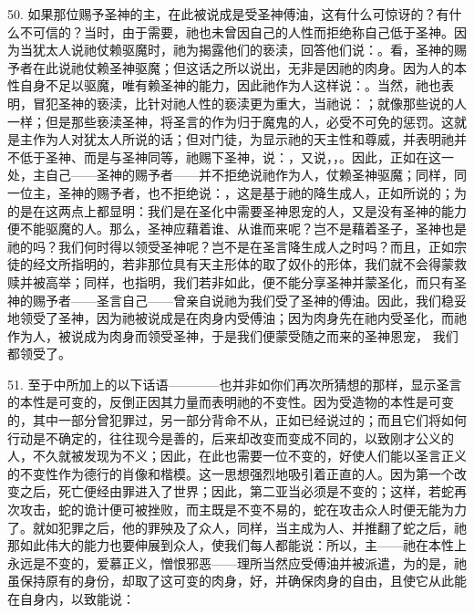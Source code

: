 50. 如果那位赐予圣神的主，在此被说成是受圣神傅油，这有什么可惊讶的？有什么不可信的？当时，由于需要，祂也未曾因自己的人性而拒绝称自己低于圣神。因为当犹太人说祂仗赖驱魔时，祂为揭露他们的亵渎，回答他们说：。看，圣神的赐予者在此说祂仗赖圣神驱魔；但这话之所以说出，无非是因祂的肉身。因为人的本性自身不足以驱魔，唯有赖圣神的能力，因此祂作为人这样说：。当然，祂也表明，冒犯圣神的亵渎，比针对祂人性的亵渎更为重大，当祂说：；就像那些说的人一样；但是那些亵渎圣神，将圣言的作为归于魔鬼的人，必受不可免的惩罚。这就是主作为人对犹太人所说的话；但对门徒，为显示祂的天主性和尊威，并表明祂并不低于圣神、而是与圣神同等，祂赐下圣神，说：，又说，，。因此，正如在这一处，主自己——圣神的赐予者——并不拒绝说祂作为人，仗赖圣神驱魔；同样，同一位主，圣神的赐予者，也不拒绝说：，这是基于祂的降生成人，正如所说的；为的是在这两点上都显明：我们是在圣化中需要圣神恩宠的人，又是没有圣神的能力便不能驱魔的人。那么，圣神应藉着谁、从谁而来呢？岂不是藉着圣子，圣神也是祂的吗？我们何时得以领受圣神呢？岂不是在圣言降生成人之时吗？而且，正如宗徒的经文所指明的，若非那位具有天主形体的取了奴仆的形体，我们就不会得蒙救赎并被高举；同样，也指明，我们若非如此，便不能分享圣神并蒙圣化，而只有圣神的赐予者——圣言自己——曾亲自说祂为我们受了圣神的傅油。因此，我们稳妥地领受了圣神，因为祂被说成是在肉身内受傅油；因为肉身先在祂内受圣化，而祂作为人，被说成为肉身而领受圣神，于是我们便蒙受随之而来的圣神恩宠， 我们都领受了。\par

51. 至于中所加上的以下话语————也并非如你们再次所猜想的那样，显示圣言的本性是可变的，反倒正因其力量而表明祂的不变性。因为受造物的本性是可变的，其中一部分曾犯罪过，另一部分背命不从，正如已经说过的；而且它们将如何行动是不确定的，往往现今是善的，后来却改变而变成不同的，以致刚才公义的人，不久就被发现为不义；因此，在此也需要一位不变的，好使人们能以圣言正义的不变性作为德行的肖像和楷模。这一思想强烈地吸引着正直的人。因为第一个改变之后，死亡便经由罪进入了世界；因此，第二亚当必须是不变的；这样，若蛇再次攻击，蛇的诡计便可被挫败，而主既是不变不易的，蛇在攻击众人时便无能为力了。就如犯罪之后，他的罪殃及了众人，同样，当主成为人、并推翻了蛇之后，祂那如此伟大的能力也要伸展到众人，使我们每人都能说：所以，主——祂在本性上永远是不变的，爱慕正义，憎恨邪恶——理所当然应受傅油并被派遣，为的是，祂虽保持原有的身份，却取了这可变的肉身，好，并确保肉身的自由，且使它从此能在自身内，以致能说：\par


